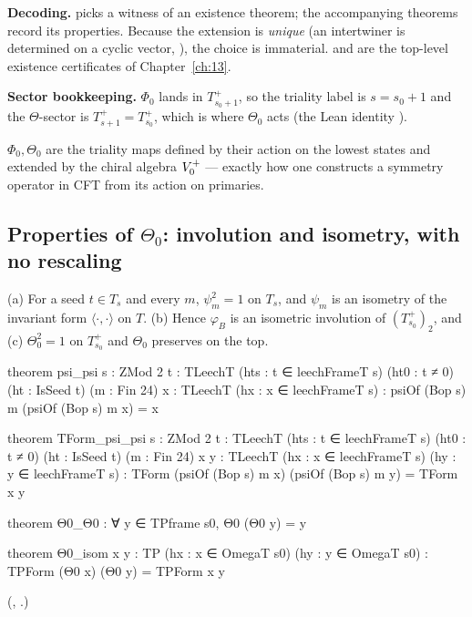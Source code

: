 \begin{dictionary}
\textbf{Decoding.}   picks a witness of an existence theorem; the accompanying theorems
record its properties.  Because the extension is \emph{unique} (an intertwiner is determined on a
cyclic vector, ), the choice is immaterial.   and
 are the top-level existence certificates of Chapter~\ref{ch:13}.

\textbf{Sector bookkeeping.}  $\Phi_0$ lands in $T_{s_0+1}^+$, so the triality label is $s=s_0+1$ and the
$\Theta$-sector is $T_{s+1}^+=T_{s_0}^+$, which is where $\Theta_0$ acts (the Lean identity
).
\end{dictionary}
\begin{physics}
$\Phi_0,\Theta_0$ are the triality maps defined by their action on the lowest states and extended by the chiral algebra $V_0^{+}$ — exactly how one constructs a symmetry operator in CFT from its action on primaries.
\end{physics}


\subsection{\texorpdfstring{Properties of $\Theta_0$: involution and isometry, with no rescaling}{Properties of Theta0: involution and isometry, with no rescaling}}

\begin{theorem}\label{ch14:thm:psi}
(a) For a seed $t\in T_s$ and every $m$, $\psi_m^2=1$ on $T_s$, and $\psi_m$ is an isometry of the
invariant form $\langle\cdot,\cdot\rangle$ on $T$.  (b) Hence $\varphi_B$ is an isometric involution of
$(T_{s_0}^+)_2$, and (c) $\Theta_0^2=1$ on $T_{s_0}^+$ and $\Theta_0$ preserves  on the top.
\end{theorem}
\begin{leancode}
theorem psi_psi {s : ZMod 2} {t : TLeechT} (hts : t ∈ leechFrameT s) (ht0 : t ≠ 0) (ht : IsSeed t)
    (m : Fin 24) {x : TLeechT} (hx : x ∈ leechFrameT s) :
    psiOf (Bop s) m (psiOf (Bop s) m x) = x

theorem TForm_psi_psi {s : ZMod 2} {t : TLeechT} (hts : t ∈ leechFrameT s) (ht0 : t ≠ 0)
    (ht : IsSeed t) (m : Fin 24) {x y : TLeechT} (hx : x ∈ leechFrameT s) (hy : y ∈ leechFrameT s) :
    TForm (psiOf (Bop s) m x) (psiOf (Bop s) m y) = TForm x y

theorem Θ0_Θ0 : ∀ y ∈ TPframe s0, Θ0 (Θ0 y) = y

theorem Θ0_isom {x y : TP} (hx : x ∈ OmegaT s0) (hy : y ∈ OmegaT s0) :
    TPForm (Θ0 x) (Θ0 y) = TPForm x y
\end{leancode}
(, .)

